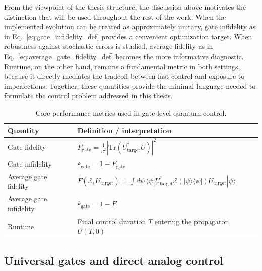 From the viewpoint of the thesis structure, the discussion above motivates the distinction that will be used throughout the rest of the work. When the implemented evolution can be treated as approximately unitary, gate infidelity as in Eq.~\eqref{eq:gate_infidelity_def} provides a convenient optimization target. When robustness against stochastic errors is studied, average fidelity as in Eq.~\eqref{eq:average_gate_fidelity_def} becomes the more informative diagnostic. Runtime, on the other hand, remains a fundamental metric in both settings, because it directly mediates the tradeoff between fast control and exposure to imperfections. Together, these quantities provide the minimal language needed to formulate the control problem addressed in this thesis.

\begin{table}[t]
\centering
\caption{Core performance metrics used in gate-level quantum control.}
\label{tab:control_metrics_summary}
\begin{tabular}{ll}
\hline
Quantity & Definition / interpretation \\
\hline
Gate fidelity &
$\displaystyle F_{\mathrm{gate}}=\frac{1}{d^2}\left|\mathrm{Tr}(U_{\mathrm{target}}^\dagger U)\right|^2$ \\[0.4em]
Gate infidelity &
$\displaystyle \varepsilon_{\mathrm{gate}}=1-F_{\mathrm{gate}}$ \\[0.4em]
Average gate fidelity &
$\displaystyle \overline{F}(\mathcal{E},U_{\mathrm{target}})
=\int d\psi\,\langle\psi|U_{\mathrm{target}}^\dagger
\mathcal{E}(|\psi\rangle\langle\psi|)U_{\mathrm{target}}|\psi\rangle$ \\[0.6em]
Average gate infidelity &
$\displaystyle \overline{\varepsilon}_{\mathrm{gate}}=1-\overline{F}$ \\[0.4em]
Runtime &
Final control duration $T$ entering the propagator $U(T,0)$ \\[0.2em]
\hline
\end{tabular}
\end{table}



\subsection{Universal gates and direct analog control}
\label{subsec:universal_gates_analog_control}

